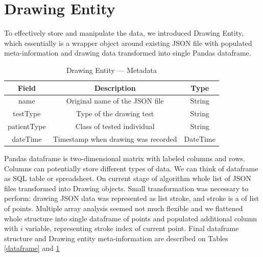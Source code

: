 \section{Drawing Entity}



To effectively store and manipulate the data, we introduced Drawing Entity, which essentially is a wrapper object around existing JSON file with populated meta-information and drawing data transformed into single Pandas dataframe. 

\begin{table}[htb]
\centering
\begin{tabular}{@{}c|c|c@{}}
\hline
Field       & Description                         & Type     \\
\hline
name        & Original name of the JSON file      & String   \\
testType    & Type of the drawing test            & String   \\
patientType & Class of tested individual          & String   \\
dateTime    & Timestamp when drawing was recorded & DateTime \\
\hline
\end{tabular}
\caption{Drawing Entity --- Metadata}
\label{metadata}
\end{table}

Pandas dataframe is two-dimensional matrix with labeled columns and rows. Columns can potentially store different types of data. We can think of dataframe as SQL table or spreadsheet. On current stage of algorithm whole list of JSON files transformed into Drawing objects. Small transformation was necessary to perform: drawing JSON data
was represented as list stroke, and stroke is a of list of points. Multiple array analysis seemed not much flexible and we flattened whole structure into single dataframe of points and populated additional column with $i$ variable, representing stroke index of current point. Final dataframe structure and Drawing entity meta-information are described on Tables \ref{dataframe} and \ref{metadata}

